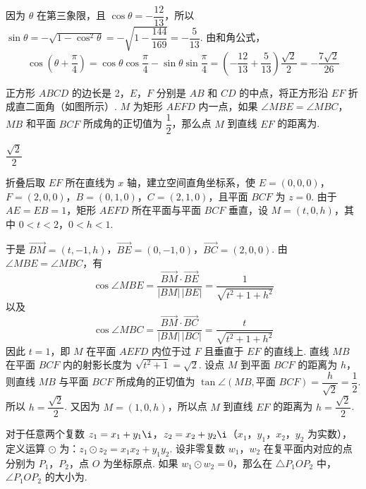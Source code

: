 \begin{solution}
因为 \(\theta\) 在第三象限，且 \(\cos\theta=-\dfrac{12}{13}\)，所以 \(\sin\theta=-\sqrt{1-\cos^{2}\theta}=-\sqrt{1-\dfrac{144}{169}}=-\dfrac{5}{13}\).
由和角公式，
\[
\cos\left(\theta+\dfrac{\pi}{4}\right)=\cos\theta\cos\dfrac{\pi}{4}-\sin\theta\sin\dfrac{\pi}{4}=\left(-\dfrac{12}{13}+\dfrac{5}{13}\right)\dfrac{\sqrt{2}}{2}=-\dfrac{7\sqrt{2}}{26}
\]
\end{solution}

\begin{problem}
正方形 \(ABCD\) 的边长是 2，\(E\)，\(F\) 分别是 \(AB\) 和 \(CD\) 的中点，将正方形沿 \(EF\) 折成直二面角（如图所示）. \(M\) 为矩形 \(AEFD\) 内一点，如果 \(\angle MBE=\angle MBC\)，\(MB\) 和平面 \(BCF\) 所成角的正切值为 \(\dfrac{1}{2}\)，那么点 \(M\) 到直线 \(EF\) 的距离为\fillinblank{}.

\end{problem}

\begin{answer}
\(\dfrac{\sqrt{2}}{2}\)
\end{answer}

\begin{solution}
折叠后取 \(EF\) 所在直线为 \(x\) 轴，建立空间直角坐标系，使 \(E=(0,0,0)\)，\(F=(2,0,0)\)，\(B=(0,1,0)\)，\(C=(2,1,0)\)，且平面 \(BCF\) 为 \(z=0\). 由于 \(AE=EB=1\)，矩形 \(AEFD\) 所在平面与平面 \(BCF\) 垂直，设 \(M=(t,0,h)\)，其中 \(0<t<2\)，\(0<h<1\).

于是 \(\overrightarrow{BM}=(t,-1,h)\)，\(\overrightarrow{BE}=(0,-1,0)\)，\(\overrightarrow{BC}=(2,0,0)\). 由 \(\angle MBE=\angle MBC\)，有
\[
\cos\angle MBE=\dfrac{\overrightarrow{BM}\cdot\overrightarrow{BE}}{\lvert BM\rvert\,\lvert BE\rvert}=\dfrac{1}{\sqrt{t^{2}+1+h^{2}}}
\]
以及
\[
\cos\angle MBC=\dfrac{\overrightarrow{BM}\cdot\overrightarrow{BC}}{\lvert BM\rvert\,\lvert BC\rvert}=\dfrac{t}{\sqrt{t^{2}+1+h^{2}}}
\]
因此 \(t=1\)，即 \(M\) 在平面 \(AEFD\) 内位于过 \(F\) 且垂直于 \(EF\) 的直线上. 直线 \(MB\) 在平面 \(BCF\) 内的射影长度为 \(\sqrt{t^{2}+1}=\sqrt{2}\).
设点 \(M\) 到平面 \(BCF\) 的距离为 \(h\)，则直线 \(MB\) 与平面 \(BCF\) 所成角的正切值为
 \(\tan\angle\left(MB,\text{平面 }BCF\right)=\dfrac{h}{\sqrt{2}}=\dfrac{1}{2}\).
所以 \(h=\dfrac{\sqrt{2}}{2}\). 又因为 \(M=(1,0,h)\)，所以点 \(M\) 到直线 \(EF\) 的距离为 \(h=\dfrac{\sqrt{2}}{2}\).
\end{solution}

\begin{problem}
对于任意两个复数 \(z_{1}=x_{1}+y_{1}\i\)，\(z_{2}=x_{2}+y_{2}\i\)（\(x_{1}\)，\(y_{1}\)，\(x_{2}\)，\(y_{2}\) 为实数），定义运算 \(\odot\) 为：\(z_{1}\odot z_{2}=x_{1}x_{2}+y_{1}y_{2}\). 设非零复数 \(w_{1}\)，\(w_{2}\) 在复平面内对应的点分别为 \(P_{1}\)，\(P_{2}\)，点 \(O\) 为坐标原点. 如果 \(w_{1}\odot w_{2}=0\)，那么在 \(\triangle P_{1}OP_{2}\) 中，\(\angle P_{1}OP_{2}\) 的大小为\fillinblank{}.
\end{problem}

